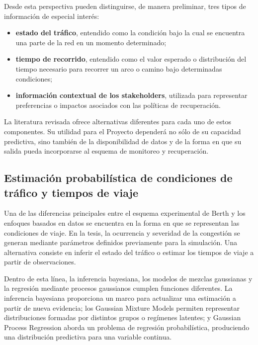 \documentclass[11pt]{article}
\begin{document}
Desde esta perspectiva pueden distinguirse, de manera preliminar, tres tipos de
información de especial interés:

\begin{itemize}
    \item \textbf{estado del tráfico}, entendido como la condición bajo la cual se
    encuentra una parte de la red en un momento determinado;

    \item \textbf{tiempo de recorrido}, entendido como el valor esperado o distribución
del tiempo necesario para recorrer un arco o camino bajo determinadas condiciones;

    \item \textbf{información contextual de los stakeholders}, utilizada para
    representar preferencias o impactos asociados con las políticas de recuperación.
\end{itemize}

La literatura revisada ofrece alternativas diferentes para cada uno de estos
componentes. Su utilidad para el Proyecto dependerá no sólo de su capacidad
predictiva, sino también de la disponibilidad de datos y de la forma en que su salida
pueda incorporarse al esquema de monitoreo y recuperación.

\subsection{Estimación probabilística de condiciones de tráfico y tiempos de viaje}

Una de las diferencias principales entre el esquema experimental de Berth y los
enfoques basados en datos se encuentra en la forma en que se representan las
condiciones de viaje. En la tesis, la ocurrencia y severidad de la congestión se generan
mediante parámetros definidos previamente para la simulación. Una alternativa consiste
en inferir el estado del tráfico o estimar los tiempos de viaje a partir de observaciones.

Dentro de esta línea, la inferencia bayesiana, los modelos de mezclas gaussianas y la
regresión mediante procesos gaussianos cumplen funciones diferentes. La inferencia
bayesiana proporciona un marco para actualizar una estimación a partir de nueva
evidencia; los Gaussian Mixture Models permiten representar distribuciones formadas
por distintos grupos o regímenes latentes; y Gaussian Process Regression aborda un
problema de regresión probabilística, produciendo una distribución predictiva para
una variable continua.
\end{document}
